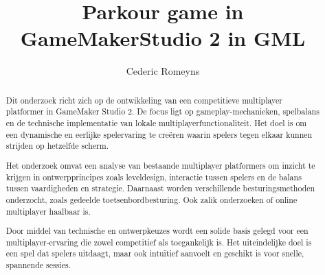 \documentclass{hogent-article}
\title{Parkour game in GameMakerStudio 2 in GML}
\author{Cederic Romeyns}
\begin{document}
\begin{abstract}  
Dit onderzoek richt zich op de ontwikkeling van een competitieve multiplayer platformer in GameMaker Studio 2. De focus ligt op gameplay-mechanieken, spelbalans en de technische implementatie van lokale multiplayerfunctionaliteit. Het doel is om een dynamische en eerlijke spelervaring te creëren waarin spelers tegen elkaar kunnen strijden op hetzelfde scherm.

Het onderzoek omvat een analyse van bestaande multiplayer platformers om inzicht te krijgen in ontwerpprincipes zoals leveldesign, interactie tussen spelers en de balans tussen vaardigheden en strategie. Daarnaast worden verschillende besturingsmethoden onderzocht, zoals gedeelde toetsenbordbesturing. Ook zalik onderzoeken of online multiplayer haalbaar is.

Door middel van technische en ontwerpkeuzes wordt een solide basis gelegd voor een multiplayer-ervaring die zowel competitief als toegankelijk is. Het uiteindelijke doel is een spel dat spelers uitdaagt, maar ook intuïtief aanvoelt en geschikt is voor snelle, spannende sessies.
  
\end{abstract}

\tableofcontents



\printbibliography[heading=bibintoc]
\end{document}
